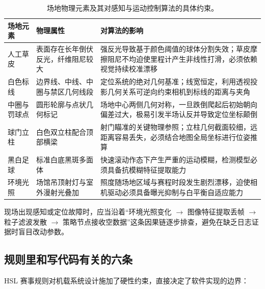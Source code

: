 \begin{table}[H]
\centering
\small
\begin{tabularx}{\textwidth}{p{2.2cm} p{4.2cm} X}
\toprule
\textbf{场地元素} & \textbf{物理属性} & \textbf{对算法的影响} \\
\midrule
人工草皮 & 表面存在长年倒伏反光，纤维阻尼较大 & 强反光导致基于颜色阈值的球体分割失效；草皮摩擦阻尼不均迫使里程计产生非线性打滑，必须依赖视觉持续校准漂移 \\
\addlinespace
白色标线 & 边界线、中线、中圈与禁区几何线段 & 定位系统的绝对几何基准；线宽恒定，利用透视投影几何关系可逆向约束相机到标线的距离与夹角 \\
\addlinespace
中圈与罚球点 & 圆形轮廓与点状几何标记 & 场地中心两侧几何对称，一旦跌倒爬起后初始朝向偏差过大，极易引发半场认反并导致定位坐标颠倒 \\
\addlinespace
球门立柱 & 白色双立柱配合顶部横梁 & 射门瞄准的关键物理参照；立柱几何截面较细，远距离容易丢失，必须结合地图全局坐标进行位姿推算 \\
\addlinespace
黑白足球 & 标准白底黑斑多面体 & 快速滚动作态下产生严重的运动模糊，检测模型必须具备抗模糊特征提取能力 \\
\addlinespace
环境光照 & 场馆吊顶射灯与室外漫射光叠加 & 照度随场地区域与赛程时段发生剧烈漂移，迫使相机驱动必须具备曝光抑制与白平衡自适应能力 \\
\bottomrule
\end{tabularx}
\caption{场地物理元素及其对感知与运动控制算法的具体约束。}
\end{table}

现场出现感知或定位故障时，应当沿着“环境光照变化 $\rightarrow$ 图像特征提取丢帧 $\rightarrow$ 粒子滤波发散 $\rightarrow$ 策略节点接收空数据”这条因果链逐步排查，避免在缺乏日志证据时盲目改动参数。

\subsection{规则里和写代码有关的六条}

HSL 赛事规则对机载系统设计施加了硬性约束，直接决定了软件实现的边界：

